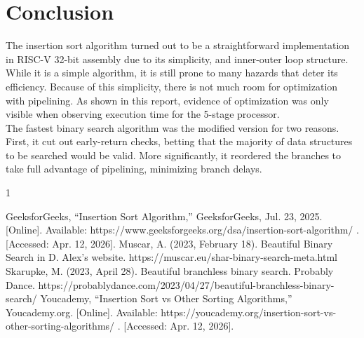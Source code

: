 \documentclass[lettersize,journal]{IEEEtran}
\begin{document}
\section{Conclusion}
    The insertion sort algorithm turned out to be a straightforward implementation in RISC-V 32-bit assembly due to its simplicity, and inner-outer loop structure. While it is a simple algorithm, it is still prone to many hazards that deter its efficiency. Because of this simplicity, there is not much room for optimization with pipelining. As shown in this report, evidence of optimization was only visible when observing execution time for the 5-stage processor.  \\
\indent The fastest binary search algorithm was the modified version for two reasons. First, it cut out early-return checks, betting that the majority of data structures to be searched would be valid. More significantly, it reordered the branches to take full advantage of pipelining, minimizing branch delays.

\begin{thebibliography}{1}


GeeksforGeeks, “Insertion Sort Algorithm,” GeeksforGeeks, Jul. 23, 2025. [Online]. Available: https://www.geeksforgeeks.org/dsa/insertion-sort-algorithm/
. [Accessed: Apr. 12, 2026].
Muscar, A. (2023, February 18). Beautiful Binary Search in D. Alex’s website. https://muscar.eu/shar-binary-search-meta.html
Skarupke, M. (2023, April 28). Beautiful branchless binary search. Probably Dance. https://probablydance.com/2023/04/27/beautiful-branchless-binary-search/
Youcademy, “Insertion Sort vs Other Sorting Algorithms,” Youcademy.org. [Online]. Available: https://youcademy.org/insertion-sort-vs-other-sorting-algorithms/
. [Accessed: Apr. 12, 2026].

\end{thebibliography}

\newpage

\vfill
\end{document}
